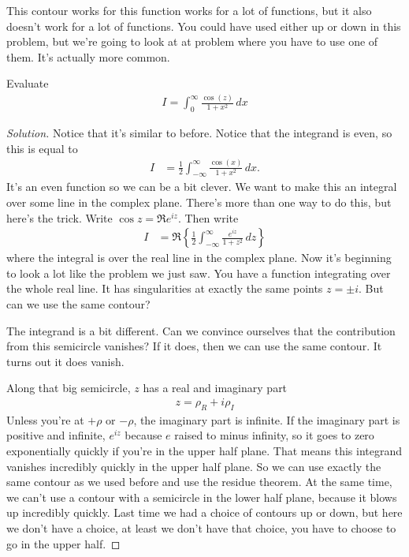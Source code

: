 This contour works for this function works for a lot of functions,
but it also doesn't work for a lot of functions.
You could have used either up or down in this problem,
but we're going to look at at problem where you have to use one of them.
It's actually more common.

\begin{example}
    Evaluate
    \begin{align}
        I = \int_{0}^{\infty} \frac{\cos(z)}{1 + x^2}\,dx
    \end{align}
\end{example}
\begin{proof}[Solution]
    Notice that it's similar to before.
    Notice that the integrand is even, so this is equal to
    \begin{align}
        I &=
        \frac{1}{2}\int_{-\infty}^{\infty}
        \frac{\cos(x)}{1 + x^2}\,dx.
    \end{align}
    It's an even function so we can be a bit clever.
    We want to make this an integral over some line in the complex plane.
    There's more than one way to do this,
    but here's the trick.
    Write $\cos z = \Re e^{iz}$.
    Then write
    \begin{align}
        I &= \Re\left\{
        \frac{1}{2}
        \int_{-\infty}^{\infty}
        \frac{e^{iz}}{1 + z^2}\,
        dz
        \right\}
    \end{align}
    where the integral is over the real line in the complex plane.
    Now it's beginning to look a lot like the problem we just saw.
    You have a function integrating over the whole real line.
    It has singularities at exactly the same points $z=\pm i$.
    But can we use the same contour?

    The integrand is a bit different.
    Can we convince ourselves that the contribution from this semicircle
    vanishes?
    If it does, then we can use the same contour.
    It turns out it does vanish.

    Along that big semicircle, $z$ has a real and imaginary part
    \begin{align}
        z = \rho_R + i\rho_I
    \end{align}
    Unless you're at $+\rho$ or $-\rho$,
    the imaginary part is infinite.
    If the imaginary part is positive and infinite,
    $e^{iz}$ because $e$ raised to minus infinity,
    so it goes to zero exponentially quickly
    if you're in the upper half plane.
    That means this integrand vanishes incredibly quickly in the upper half
    plane.
    So we can use exactly the same contour as we used before
    and use the residue theorem.
    At the same time,
    we can't use a contour with a semicircle in the lower half plane,
    because it blows up incredibly quickly.
    Last time we had a choice of contours up or down,
    but here we don't have a choice,
    at least we don't have that choice,
    you have to choose to go in the upper half.
\end{proof}
